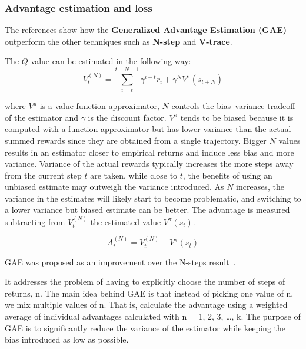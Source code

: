\documentclass[11pt, a4paper, hidelinks]{report}
\begin{document}
\subsubsection{Advantage estimation and loss}\label{subsubsec:advantage-estimation}

The references show how the \textbf{Generalized Advantage Estimation (GAE)} outperform the other techniques such as \textbf{N-step} and \textbf{V-trace}.

The $Q$ value can be estimated in the following way:
\begin{equation}
	V_t^{(N)} = \sum_{i = t}^{t + N - 1} \gamma^{i - t}r_i + \gamma^{N}V^{\pi}(s_{t + N})\label{eq:N-step}
\end{equation}

where $V^{\pi}$ is a value function approximator, $N$ controls the bias–variance tradeoff of the estimator and $\gamma$ is the discount factor.
$V^{\pi}$ tends to be biased because it is computed with a function approximator but has lower variance than the actual summed rewards since they are obtained from a single trajectory.
Bigger $N$ values results in an estimator closer to empirical returns and induce less bias and more variance.
Variance of the actual rewards typically increases the more steps away from the current step $t$ are taken, while close to $t$, the benefits of using an unbiased estimate may outweigh the variance introduced.
As $N$ increases, the variance in the estimates will likely start to become problematic, and switching to a lower variance but biased estimate can be better.
The advantage is measured subtracting from $V_t^{(N)}$ the estimated value $V^{\pi}(s_t)$.

\begin{equation}
	A_t^{(N)} = V_t^{(N)} - V^{\pi}(s_t)\label{eq:N-step-advantage}
\end{equation}

GAE was proposed as an improvement over the N-steps result~\citep{gae}.

\begin{quoting}[font=itshape, begintext={"}, endtext={"\citep{graesser2019foundations}}]
It addresses the problem of having to explicitly choose the number of steps of returns, n.
The main idea behind GAE is that instead of picking one value of n, we mix multiple values of n.
That is, calculate the advantage using a weighted average of individual advantages calculated with n = 1, 2, 3, \dots, k.
The purpose of GAE is to significantly reduce the variance of the estimator while keeping the bias introduced as low as possible.
\end{quoting}
\end{document}
